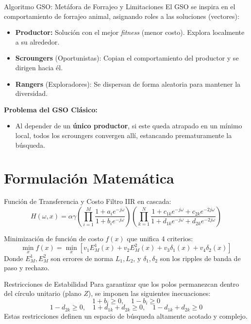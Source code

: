 \documentclass[10pt]{beamer}
\begin{document}
\begin{frame}{Algoritmo GSO: Metáfora de Forrajeo y Limitaciones}
  El GSO se inspira en el comportamiento de forrajeo animal, asignando roles a las soluciones (vectores):
  \begin{itemize}
    \item \textbf{Productor:} Solución con el mejor \textit{fitness} (menor costo). Explora localmente a su alrededor.
    \item \textbf{Scroungers} (Oportunistas): Copian el comportamiento del productor y se dirigen hacia él.
    \item \textbf{Rangers} (Exploradores): Se dispersan de forma aleatoria para mantener la diversidad.
  \end{itemize}
  \vspace{0.3cm}
  \textbf{Problema del GSO Clásico:}
  \begin{itemize}
    \item Al depender de un \textbf{único productor}, si este queda atrapado en un mínimo local, todos los scroungers convergen allí, estancando prematuramente la búsqueda.
  \end{itemize}
\end{frame}

\section{Formulación Matemática}

\begin{frame}{Función de Transferencia y Costo}
  Filtro IIR en cascada:
  \begin{equation}
    H(\omega, x) = \alpha \gamma \left( \prod_{i=1}^M \frac{1 + a_i e^{-j\omega}}{1 + b_i e^{-j\omega}} \right) \left( \prod_{k=1}^N \frac{1 + c_{1k} e^{-j\omega} + c_{2k} e^{-2j\omega}}{1 + d_{1k} e^{-j\omega} + d_{2k} e^{-2j\omega}} \right)
  \end{equation}
  
  Minimización de función de costo $f(x)$ que unifica 4 criterios:
  \begin{equation}
    \min_x f(x) = \min_x \left[ v_1 E^1_M(x) + v_2 E^2_M(x) + v_3 \delta_1(x) + v_4 \delta_2(x) \right]
  \end{equation}
  Donde $E^1_M, E^2_M$ son errores de norma $L_1, L_2$, y $\delta_1, \delta_2$ son los ripples de banda de paso y rechazo.
\end{frame}

\begin{frame}{Restricciones de Estabilidad}
  Para garantizar que los polos permanezcan dentro del círculo unitario (plano $Z$), se imponen las siguientes inecuaciones:
  \begin{equation*}
    1 + b_i \ge 0, \quad 1 - b_i \ge 0
  \end{equation*}
  \begin{equation*}
    1 - d_{2k} \ge 0, \quad 1 + d_{1k} + d_{2k} \ge 0, \quad 1 - d_{1k} + d_{2k} \ge 0
  \end{equation*}
  Estas restricciones definen un espacio de búsqueda altamente acotado y complejo.
\end{frame}
\end{document}

